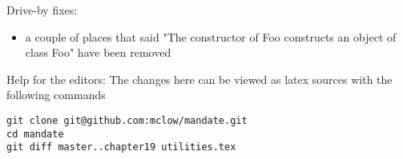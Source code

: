Drive-by fixes:
\begin{itemize}
\item{a couple of places that said "The constructor of Foo constructs an object of class Foo" have been removed}
\end{itemize}


\vfill
Help for the editors: The changes here can be viewed as latex sources with the following commands
\begin{verbatim}
git clone git@github.com:mclow/mandate.git
cd mandate
git diff master..chapter19 utilities.tex
\end{verbatim}
\newpage
